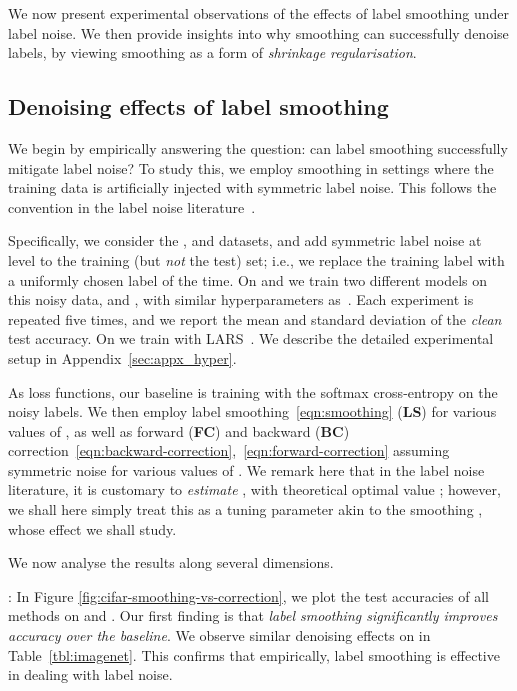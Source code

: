 We now present experimental observations of the effects of label smoothing under label noise.
We then provide insights into why smoothing can successfully denoise labels,
by viewing smoothing as a form of \emph{shrinkage regularisation}.

\subsection{Denoising effects of label smoothing}

We begin by empirically answering the question: can label smoothing successfully mitigate label noise?
To study this,
we employ smoothing in settings where the training data is artificially injected with symmetric label noise.
This follows the convention in the label noise literature~\citep{Patrini:2017,Han:2018b,Charoenphakdee:2019}.

Specifically, 
we consider the \cifarT{}, \cifarH{} and \imagenet{} datasets, 
and add symmetric label noise at level  to the training (but \emph{not} the test) set;
i.e.,
we replace the training label with a uniformly chosen label  of the time.
On \cifarT{} and \cifarH{} we train two different models on this noisy data, \resnetT{} and \resnetF{},
with similar hyperparameters as~\citet{Muller:2019}.
Each experiment is repeated five times, and we report the mean and standard deviation of the \emph{clean} test accuracy.
On \imagenet{} we train \resnetIM{} with LARS~\cite{you2017large}.
We describe the detailed experimental setup in Appendix~\ref{sec:appx_hyper}.

As loss functions, 
our baseline
is
training with the softmax cross-entropy on the noisy labels.
We then employ label smoothing~\eqref{eqn:smoothing} ({\bf LS}) for various values of ,
as well as forward ({\bf FC}) and backward ({\bf BC}) correction~\eqref{eqn:backward-correction},~\eqref{eqn:forward-correction}  assuming symmetric noise for various values of .
We remark here that in the label noise literature, it is customary to \emph{estimate} ,
with theoretical optimal value ;
however, we shall here simply treat this as a tuning parameter akin to the smoothing , 
whose effect we shall study.

We now analyse the results along several dimensions.

:
In Figure \ref{fig:cifar-smoothing-vs-correction}, we plot the test accuracies of all methods on \cifarT{} and \cifarH{}.
Our first finding is that
\emph{label smoothing significantly improves accuracy over the baseline}.
We observe similar denoising effects on \imagenet{} in Table~\ref{tbl:imagenet}.
This confirms that empirically, label smoothing is effective in dealing with label noise. 



